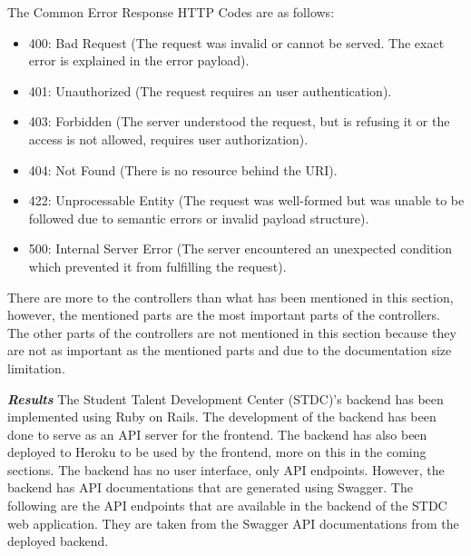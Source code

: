 \begin{justify}
    \vspace{0.25cm}
    \newendline The Common Error Response HTTP Codes are as follows:

    \begin{itemize}
        \item 400: Bad Request (The request was invalid or cannot be served. The exact error is explained in the error payload).
        \item 401: Unauthorized (The request requires an user authentication).
        \item 403: Forbidden (The server understood the request, but is refusing it or the access is not allowed, requires user authorization).
        \item 404: Not Found (There is no resource behind the URI).
        \item 422: Unprocessable Entity (The request was well-formed but was unable to be followed due to semantic errors or invalid payload structure).
        \item 500: Internal Server Error (The server encountered an unexpected condition which prevented it from fulfilling the request).
    \end{itemize}

    \vspace{0.25cm}
    \newendline There are more to the controllers than what has been mentioned in this section, however, the mentioned parts are the most important parts of the controllers. The other parts of the controllers are not mentioned in this section because they are not as important as the mentioned parts and due to the documentation size limitation.\\

    \clearpage




    \vspace{0.25cm}
    \newendline \textbf{\textit{Results}}\newendline
        The Student Talent Development Center (STDC)'s backend has been implemented using Ruby on Rails. The development of the backend has been done to serve as an API server for the frontend. The backend has also been deployed to Heroku to be used by the frontend, more on this in the coming sections. The backend has no user interface, only API endpoints. However, the backend has API documentations that are generated using Swagger. The following are the API endpoints that are available in the backend of the STDC web application. They are taken from the Swagger API documentations from the deployed backend.


\end{justify}
